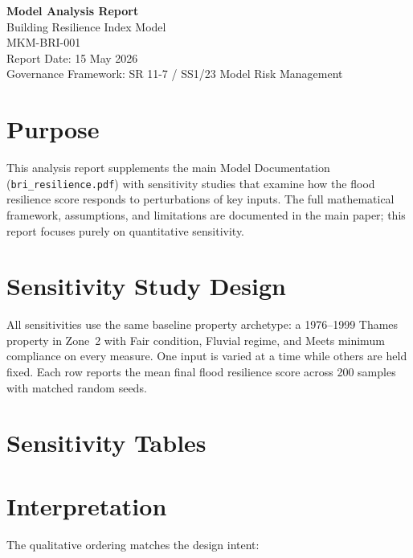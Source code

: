\documentclass[11pt,a4paper]{article}
\begin{document}
\begin{center}
{\Large\textbf{Model Analysis Report}}\\[6pt]
{\large\textcolor{mkmblue}{Building Resilience Index Model}}\\[4pt]
{\normalsize MKM-BRI-001}\\[12pt]
{\small Report Date: 15 May 2026}\\[4pt]
{\footnotesize Governance Framework: SR 11-7 / SS1/23 Model Risk Management}
\end{center}

\vspace{6pt}

\section*{Purpose}
This analysis report supplements the main Model Documentation
(\texttt{bri\_resilience.pdf}) with sensitivity studies that examine how the
flood resilience score responds to perturbations of key inputs. The full
mathematical framework, assumptions, and limitations are documented in the
main paper; this report focuses purely on quantitative sensitivity.

\section*{Sensitivity Study Design}
All sensitivities use the same baseline property archetype: a 1976--1999
Thames property in Zone~2 with Fair condition, Fluvial regime, and Meets
minimum compliance on every measure. One input is varied at a time while
others are held fixed. Each row reports the mean final flood resilience
score across 200 samples with matched random seeds.

\section*{Sensitivity Tables}


\section*{Interpretation}
The qualitative ordering matches the design intent:
\end{document}
